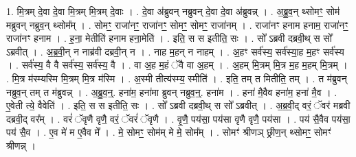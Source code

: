 \documentclass[17pt]{extarticle}
\begin{document}
1. मि॒त्रम् दे॒वा दे॒वा मि॒त्रम् मि॒त्रम् दे॒वाः । . दे॒वा अ॑ब्रुवन् नब्रुवन् दे॒वा दे॒वा अ॑ब्रुवन्न् । . अ॒ब्रु॒व॒न् थ्सोमꣳ॒॒ सोम॑ मब्रुवन् नब्रुव॒न् थ्सोम᳚म् । . सोमꣳ॒॒ राजा॑नꣳ॒॒ राजा॑नꣳ॒॒ सोमꣳ॒॒ सोमꣳ॒॒ राजा॑नम् । . राजा॑नꣳ हनाम हनाम॒ राजा॑नꣳ॒॒ राजा॑नꣳ हनाम । . ह॒ना॒ मेतीति॑ हनाम हना॒मेति॑ । . इति॒ स स इतीति॒ सः । . सो᳚ ऽब्रवी दब्रवी॒थ् स सो᳚ ऽब्रवीत् । . अ॒ब्र॒वी॒न् न नाब्र॑वी दब्रवी॒न् न । . नाह म॒हन् न नाहम् । . अ॒हꣳ सर्व॑स्य॒ सर्व॑स्या॒ह म॒हꣳ सर्व॑स्य । . सर्व॑स्य॒ वै वै सर्व॑स्य॒ सर्व॑स्य॒ वै । . वा अ॒ह म॒हं ॅवै वा अ॒हम् । . अ॒हम् मि॒त्रम् मि॒त्र म॒ह म॒हम् मि॒त्रम् । . मि॒त्र म॑स्म्यस्मि मि॒त्रम् मि॒त्र म॑स्मि । . अ॒स्मी तीत्य॑स्म्य॒ स्मीति॑ । . इति॒ तम् त मितीति॒ तम् । . त म॑ब्रुवन् नब्रुव॒न् तम् त म॑ब्रुवन्न् । . अ॒ब्रु॒व॒न्॒. हना॑म॒ हना॑मा ब्रुवन् नब्रुव॒न्॒. हना॑म । . हना॑ मै॒वैव हना॑म॒ हना॑ मै॒व । . ए॒वेती त्ये॒ वैवेति॑ । . इति॒ स स इतीति॒ सः । . सो᳚ ऽब्रवी दब्रवी॒थ् स सो᳚ ऽब्रवीत् । . अ॒ब्र॒वी॒द् वरं॒ ॅवर॑ मब्रवी दब्रवी॒द् वर᳚म् । . वरं॑ ॅवृणै वृणै॒ वरं॒ ॅवरं॑ ॅवृणै । . वृ॒णै॒ पय॑सा॒ पय॑सा वृणै वृणै॒ पय॑सा । . पय॑ सै॒वैव पय॑सा॒ पय॑ सै॒व । . ए॒व मे॑ म ए॒वैव मे᳚ । . मे॒ सोमꣳ॒॒ सोम॑म् मे मे॒ सोम᳚म् । . सोमꣳ॑ श्रीणञ् छ्रीण॒न् थ्सोमꣳ॒॒ सोमꣳ॑ श्रीणन्न् । \newline
\end{document}
